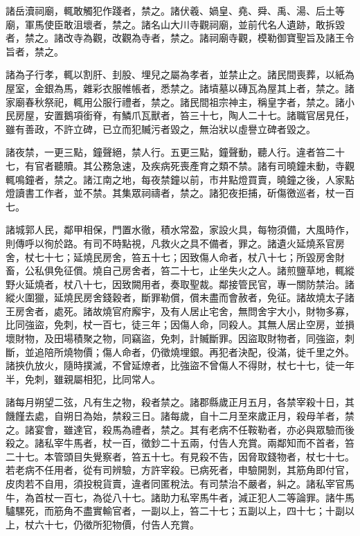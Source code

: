 \begin{pinyinscope}
 諸岳瀆祠廟，輒敢觸犯作踐者，禁之。諸伏羲、媧皇、堯、舜、禹、湯、后土等廟，軍馬使臣敢沮壞者，禁之。諸名山大川寺觀祠廟，並前代名人遺跡，敢拆毀者，禁之。諸改寺為觀，改觀為寺者，禁之。諸祠廟寺觀，模勒御寶聖旨及諸王令旨者，禁之。



 諸為子行孝，輒以割肝、刲股、埋兒之屬為孝者，並禁止之。諸民間喪葬，以紙為屋室，金銀為馬，雜彩衣服帷帳者，悉禁之。諸墳墓以磚瓦為屋其上者，禁之。諸家廟春秋祭祀，輒用公服行禮者，禁之。諸民間祖宗神主，稱皇字者，禁之。諸小民房屋，安置鵝項銜脊，有鱗爪瓦獸者，笞三十七，陶人二十七。諸職官居見任，雖有善政，不許立碑，已立而犯贓污者毀之，無治狀以虛譽立碑者毀之。



 諸夜禁，一更三點，鐘聲絕，禁人行。五更三點，鐘聲動，聽人行。違者笞二十七，有官者聽贖。其公務急速，及疾病死喪產育之類不禁。諸有司曉鐘未動，寺觀輒鳴鐘者，禁之。諸江南之地，每夜禁鐘以前，市井點燈買賣，曉鐘之後，人家點燈讀書工作者，並不禁。其集眾祠禱者，禁之。諸犯夜拒捕，斫傷徼巡者，杖一百七。



 諸城郭人民，鄰甲相保，門置水徹，積水常盈，家設火具，每物須備，大風時作，則傳呼以徇於路。有司不時點視，凡救火之具不備者，罪之。諸遺火延燒系官房舍，杖七十七；延燒民房舍，笞五十七；因致傷人命者，杖八十七；所毀房舍財畜，公私俱免征償。燒自己房舍者，笞二十七，止坐失火之人。諸煎鹽草地，輒縱野火延燒者，杖八十七，因致闕用者，奏取聖裁。鄰接管民官，專一關防禁治。諸縱火圍獵，延燒民房舍錢穀者，斷罪勒償，償未盡而會赦者，免征。諸故燒太子諸王房舍者，處死。諸故燒官府廨宇，及有人居止宅舍，無問舍宇大小，財物多寡，比同強盜，免刺，杖一百七，徒三年；因傷人命，同殺人。其無人居止空房，並損壞財物，及田場積聚之物，同竊盜，免刺，計贓斷罪。因盜取財物者，同強盜，刺斷，並追陪所燒物價；傷人命者，仍徵燒埋銀。再犯者決配，役滿，徙千里之外。諸挾仇放火，隨時撲滅，不曾延燎者，比強盜不曾傷人不得財，杖七十七，徒一年半，免刺，雖親屬相犯，比同常人。



 諸每月朔望二弦，凡有生之物，殺者禁之。諸郡縣歲正月五月，各禁宰殺十日，其饑饉去處，自朔日為始，禁殺三日。諸每歲，自十二月至來歲正月，殺母羊者，禁之。諸宴會，雖達官，殺馬為禮者，禁之。其有老病不任鞍勒者，亦必與眾驗而後殺之。諸私宰牛馬者，杖一百，徵鈔二十五兩，付告人充賞。兩鄰知而不首者，笞二十七。本管頭目失覺察者，笞五十七。有見殺不告，因脅取錢物者，杖七十七。若老病不任用者，從有司辨驗，方許宰殺。已病死者，申驗開剝，其筋角即付官，皮肉若不自用，須投稅貨賣，違者同匿稅法。有司禁治不嚴者，糾之。諸私宰官馬牛，為首杖一百七，為從八十七。諸助力私宰馬牛者，減正犯人二等論罪。諸牛馬驢騾死，而筋角不盡實輸官者，一副以上，笞二十七；五副以上，四十七；十副以上，杖六十七，仍徵所犯物價，付告人充賞。




\end{pinyinscope}
